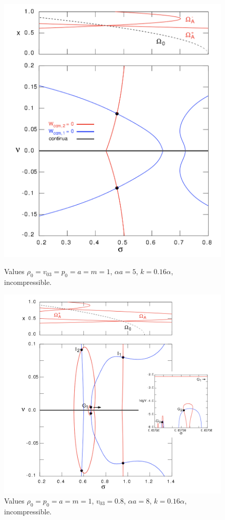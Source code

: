 \documentclass[12pt]{article}
\begin{document}
\begin{figure}[h]
	\centering
	\begin{minipage}{0.42\textwidth}
		\centering
		\includegraphics[width=\textwidth]{internal_kink.png}
		\caption{Values $\rho_0 = v_{03} = p_0 = a = m = 1$, $\alpha a = 5$, $k = 0.16\alpha$, incompressible.}
	\end{minipage}\hfill
	\begin{minipage}{0.53\textwidth}
		\centering
		\includegraphics[width=\textwidth]{internal_kink2.png}
		\caption{Values $\rho_0 = p_0 = a = m = 1$, $v_{03} = 0.8$, $\alpha a = 8$, $k = 0.16\alpha$, incompressible.}
	\end{minipage}
\end{figure}




\end{document}
